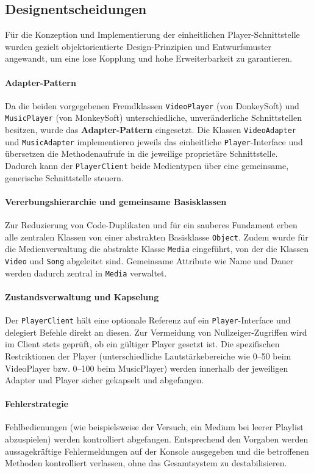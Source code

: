 \documentclass[a4paper,12pt]{article}
\begin{document}
\newpage
\subsection{Designentscheidungen}
Für die Konzeption und Implementierung der einheitlichen Player-Schnittstelle wurden gezielt objektorientierte Design-Prinzipien und Entwurfsmuster angewandt, um eine lose Kopplung und hohe Erweiterbarkeit zu garantieren.

\paragraph{Adapter-Pattern}
Da die beiden vorgegebenen Fremdklassen \texttt{VideoPlayer} (von DonkeySoft) und \texttt{MusicPlayer} (von MonkeySoft) unterschiedliche, unveränderliche Schnittstellen besitzen, wurde das \textbf{Adapter-Pattern} eingesetzt. Die Klassen \texttt{VideoAdapter} und \texttt{MusicAdapter} implementieren jeweils das einheitliche \texttt{Player}-Interface und übersetzen die Methodenaufrufe in die jeweilige proprietäre Schnittstelle. Dadurch kann der \texttt{PlayerClient} beide Medientypen über eine gemeinsame, generische Schnittstelle steuern.

\paragraph{Vererbungshierarchie und gemeinsame Basisklassen}
Zur Reduzierung von Code-Duplikaten und für ein sauberes Fundament erben alle zentralen Klassen von einer abstrakten Basisklasse \texttt{Object}. Zudem wurde für die Medienverwaltung die abstrakte Klasse \texttt{Media} eingeführt, von der die Klassen \texttt{Video} und \texttt{Song} abgeleitet sind. Gemeinsame Attribute wie Name und Dauer werden dadurch zentral in \texttt{Media} verwaltet.

\paragraph{Zustandsverwaltung und Kapselung}
Der \texttt{PlayerClient} hält eine optionale Referenz auf ein \texttt{Player}-Interface und delegiert Befehle direkt an diesen. Zur Vermeidung von Nullzeiger-Zugriffen wird im Client stets geprüft, ob ein gültiger Player gesetzt ist. Die spezifischen Restriktionen der Player (unterschiedliche Lautstärkebereiche wie 0--50 beim VideoPlayer bzw. 0--100 beim MusicPlayer) werden innerhalb der jeweiligen Adapter und Player sicher gekapselt und abgefangen.

\paragraph{Fehlerstrategie}
Fehlbedienungen (wie beispielsweise der Versuch, ein Medium bei leerer Playlist abzuspielen) werden kontrolliert abgefangen. Entsprechend den Vorgaben werden aussagekräftige Fehlermeldungen auf der Konsole ausgegeben und die betroffenen Methoden kontrolliert verlassen, ohne das Gesamtsystem zu destabilisieren.
\end{document}
